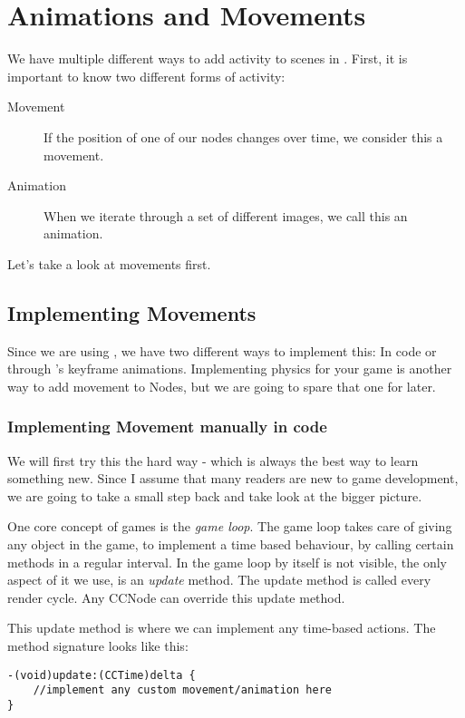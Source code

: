 \chapter{Animations and Movements}
We have multiple different ways to add activity to scenes in \cocos{}. First, it
is important to know two different forms of activity:
 
\begin{description}
  \item[Movement] If the position of one of our nodes changes over time, we
  consider this a movement.
  \item[Animation] When we iterate through a set of different images, we call
  this an animation.
\end{description}

Let's take a look at movements first.

\section{Implementing Movements}
Since we are using \spriteb{}, we have two different ways to implement this:
In code or through \spriteb{}'s keyframe animations. Implementing physics for
your game is another way to add movement to Nodes, but we are going to spare
that one for later.

\subsection{Implementing Movement manually in code}
We will first try this the hard way - which is always the best way to learn
something new. Since I assume that many readers are new to game development, we
are going to take a small step back and take look at the bigger picture.

One core concept of games is the \textit{game loop}. The game loop takes care of
giving any object in the game, to implement a time based behaviour, by calling
certain methods in a regular interval. In \cocos{} the game loop by itself is
not visible, the only aspect of it we use, is an \textit{update} method. The
update method is called every render cycle. Any CCNode can override this update
method.

This update method is where we can implement any time-based actions. The method
signature looks like this:

\begin{lstlisting}
-(void)update:(CCTime)delta {
	//implement any custom movement/animation here
}
\end{lstlisting}

